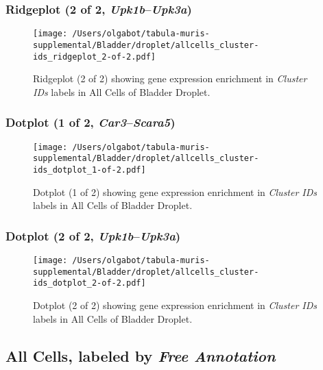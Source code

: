 \clearpage

\subsubsection{Ridgeplot (2 of 2, \emph{Upk1b}--\emph{Upk3a})}
\begin{figure}[h]
\centering
\texttt{[image: /Users/olgabot/tabula-muris-supplemental/Bladder/droplet/allcells\_cluster-ids\_ridgeplot\_2-of-2.pdf]}

\caption{ Ridgeplot (2 of 2)  showing gene expression enrichment in \emph{Cluster IDs} labels in All Cells of Bladder Droplet. }
\end{figure}


\clearpage

\subsubsection{Dotplot (1 of 2, \emph{Car3}--\emph{Scara5})}
\begin{figure}[h]
\centering
\texttt{[image: /Users/olgabot/tabula-muris-supplemental/Bladder/droplet/allcells\_cluster-ids\_dotplot\_1-of-2.pdf]}

\caption{ Dotplot (1 of 2)  showing gene expression enrichment in \emph{Cluster IDs} labels in All Cells of Bladder Droplet. }
\end{figure}


\clearpage

\subsubsection{Dotplot (2 of 2, \emph{Upk1b}--\emph{Upk3a})}
\begin{figure}[h]
\centering
\texttt{[image: /Users/olgabot/tabula-muris-supplemental/Bladder/droplet/allcells\_cluster-ids\_dotplot\_2-of-2.pdf]}

\caption{ Dotplot (2 of 2)  showing gene expression enrichment in \emph{Cluster IDs} labels in All Cells of Bladder Droplet. }
\end{figure}


\clearpage

\subsection{All Cells, labeled by \emph{Free Annotation}}
